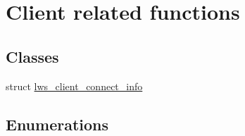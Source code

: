 \hypertarget{group__client}{}\section{Client related functions}
\label{group__client}
\subsection*{Classes}
\begin{DoxyCompactItemize}
\item 
struct \hyperlink{structlws__client__connect__info}{lws\+\_\+client\+\_\+connect\+\_\+info}
\end{DoxyCompactItemize}
\subsection*{Enumerations}
